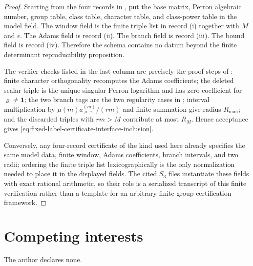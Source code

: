 \documentclass[11pt,a4paper]{amsart}
\theoremstyle{plain}
\theoremstyle{definition}
\theoremstyle{remark}
\begin{document}
\begin{proof}
  Starting from the four records in
  , put the base matrix,
  Perron algebraic number, group table, class table, character table, and
  class-power table in the model field.  The window field is the finite triple
  list in record \textup{(i)} together with \(M\) and \(\epsilon\).  The Adams
  field is record \textup{(ii)}.  The branch field is record \textup{(iii)}.
  The bound field is record \textup{(iv)}.  Therefore the schema contains no
  datum beyond the finite determinant reproducibility proposition.

  The verifier checks listed in the last column are precisely the proof steps
  of : finite character
  orthogonality recomputes the Adams coefficients; the deleted scalar triple is
  the unique singular Perron logarithm and has zero coefficient for
  \(\varrho\ne\mathbf1\); the two branch tags are the two regularity cases in
  ; interval multiplication by
  \(\mu(m)a_{\varrho,
  \pi}^{(m)}/(rm)\) and finite summation give radius
  \(R_{\mathrm{num}}\); and the discarded triples with \(rm>M\) contribute at
  most \(R_M\).  Hence acceptance gives
  \eqref{eq:fixed-label-certificate-interface-inclusion}.

  Conversely, any four-record certificate of the kind used here already
  specifies the same
  model data, finite window, Adams coefficients, branch intervals, and two
  radii; ordering the finite triple list lexicographically is the only
  normalization needed to place it in the displayed fields.  The cited
  \(S_3\) files instantiate these fields with exact rational arithmetic,
  so their role is a serialized transcript of this finite verification rather
  than a template for an arbitrary finite-group certification framework.
\end{proof}


\section*{Competing interests}
The author declares none.



\end{document}
